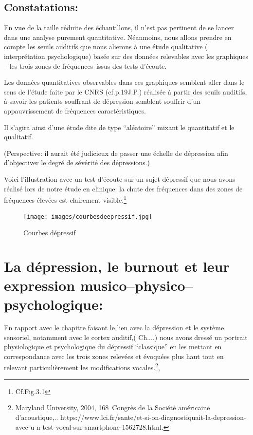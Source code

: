                                              
\subsection{Constatations: }
En vue de la taille réduite des échantillons, il n'est pas
pertinent de se lancer dans une analyse purement
quantitative. Néanmoins, nous 
allons prendre en compte les seuils auditifs que nous  alierons à une étude
qualitative ( interprétation psychologique) basée sur 
des données relevables avec les
graphiques -- les trois zones de fréquences--issus des tests d'écoute.


Les données quantitatives observables dans ces graphiques semblent aller dans le
sens de  l'étude faite par le
CNRS (cf.p.19J.P.) réalisée à partir des seuils auditifs, à savoir
les patients souffrant de dépression semblent souffrir d'un
appauvrissement de fréquences caractéristiques.

Il s'agira  ainsi d'une étude dite de type  ``aléatoire'' mixant le  quantitatif  et le qualitatif.

(Perspective: il aurait été judicieux de passer une échelle de
dépression afin d'objectiver le degré de sévérité des dépressions.)

Voici l'illustration avec un test
d'écoute sur un sujet dépressif que nous avons réalisé lors de notre
étude en clinique: la
chute des fréquences dans des zones de fréquences élevées est
clairement visible.\footnote{Cf.Fig.3.1}
 \begin{figure}
	\centering
	\texttt{[image: images/courbesdeepressif.jpg]}
	\caption{Courbes dépressif}
	\label{fig:courbes du dépressif}
      \end{figure}

  \section{La dépression, le burnout et leur expression
    musico--physico--psychologique:}

  
En rapport  avec le chapitre faisant le lien avec la dépression et le
système sensoriel, notamment avec le cortex auditif,( Ch....) nous
avons dressé un portrait
physiologique et psychologique du dépressif ``classique''
  en les mettant en correspondance avec les trois zones relevées et
  évoquées plus haut tout en relevant particulièrement
les modifications vocales.\footnote{ Maryland
  University, 2004, 168\ieme\ Congrès de la Société
américaine d'acoustique,.\autocite{le_service_metronews}. https://www.lci.fr/sante/et-si-on-diagnostiquait-la-depression-avec-u
n-test-vocal-sur-smartphone-1562728.html.},	
 

